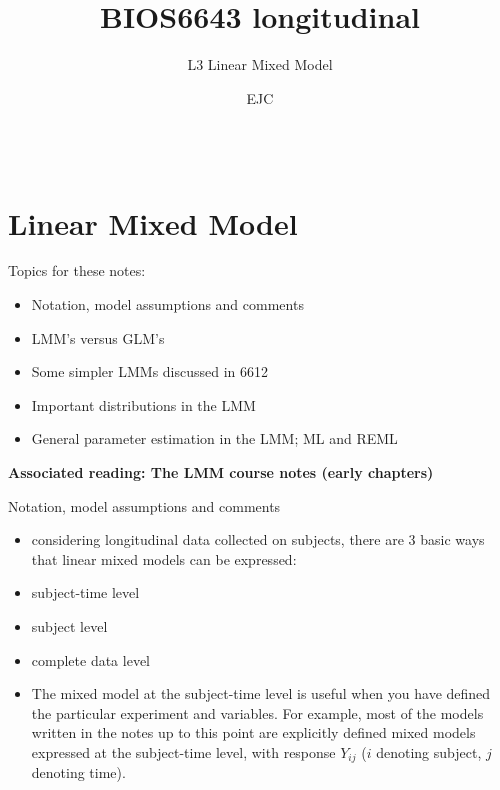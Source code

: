 \documentclass[
  9pt,
  ignorenonframetext,
]{beamer}
\title{BIOS6643 longitudinal}
\subtitle{L3 Linear Mixed Model}
\author{EJC}
\date{}
\institute{Department of Biostatistics \& Informatics}
\providecommand{\tightlist}{%
  \setlength{\itemsep}{0pt}\setlength{\parskip}{0pt}}
\begin{document}
\frame{\titlepage}

\begin{frame}
  \begin{columns}
  \column{10cm}
  \tableofcontents
  \end{columns}
\end{frame}
\hypertarget{linear-mixed-model}{%
\section{Linear Mixed Model}\label{linear-mixed-model}}

\begin{frame}{Topics for these notes:}
\protect\hypertarget{topics-for-these-notes}{}
\begin{itemize}
\tightlist
\item
  Notation, model assumptions and comments
\item
  LMM's versus GLM's
\item
  Some simpler LMMs discussed in 6612
\item
  Important distributions in the LMM
\item
  General parameter estimation in the LMM; ML and REML
\end{itemize}

\textbf{Associated reading: The LMM course notes (early chapters)}
\end{frame}

\begin{frame}{Notation, model assumptions and comments}
\protect\hypertarget{notation-model-assumptions-and-comments}{}
\begin{itemize}
\item
  considering longitudinal data collected on subjects, there are 3 basic
  ways that linear mixed models can be expressed:
\item
  subject-time level
\item
  subject level
\item
  complete data level
\item
  The mixed model at the subject-time level is useful when you have
  defined the particular experiment and variables. For example, most of
  the models written in the notes up to this point are explicitly
  defined mixed models expressed at the subject-time level, with
  response \(Y_{ij}\) (\(i\) denoting subject, \(j\) denoting time).
\end{itemize}
\end{frame}
\end{document}
